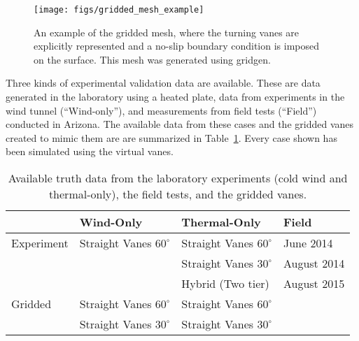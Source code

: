  \begin{figure}[!htb]
   \begin{center}
    \texttt{[image: figs/gridded\_mesh\_example]}
    \caption{An example of the gridded mesh, where the turning vanes
    are explicitly represented and a no-slip boundary condition is
    imposed on the surface. This mesh was generated using gridgen.} 
    \label{fig:gridded_mesh}
   \end{center}
 \end{figure}

Three kinds of experimental validation data are available. These are
data generated in the laboratory using a heated plate, data from
experiments in the wind tunnel (``Wind-only''), and measurements from field
tests (``Field'') conducted in Arizona. The available data from
these cases and the gridded vanes created to mimic them are are
summarized in Table~\ref{tab:val_data}. Every case shown has been
simulated using the virtual vanes.   

\begin{table}[h]
\centering
\label{my-label}
\begin{tabular}{l|l|l|l|}
           & Wind-Only                   & Thermal-Only                & Field  \\
  \hline 
Experiment & Straight Vanes $60^{\circ}$ & Straight Vanes $60^{\circ}$ & June 2014   \\
           &                           & Straight Vanes $30^{\circ}$   & August 2014 \\
           &                           & Hybrid (Two tier)             & August 2015 \\
  \hline 
Gridded    & Straight Vanes $60^{\circ}$ & Straight Vanes $60^{\circ}$ & \\
           & Straight Vanes $30^{\circ}$ & Straight Vanes $30^{\circ}$ & \\
  \hline 
\end{tabular}
  \caption{Available truth data from the laboratory experiments 
    (cold wind and thermal-only), the field tests, and the gridded
 vanes.}  
  \label{tab:val_data}
\end{table}
%
%
%
%
%


%
%
